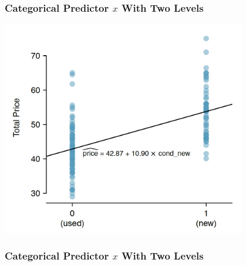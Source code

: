 \documentclass[handout]{beamer}
\begin{document}
\begin{frame}[fragile]
\frametitle{Categorical Predictor $x$ With Two Levels}

\begin{center}
\includegraphics[width=0.8\textwidth]{figure/mario_kart.png}
\end{center}

\end{frame}


\begin{frame}[fragile]
\frametitle{Categorical Predictor $x$ With Two Levels}
%
%

\end{frame}
\end{document}
